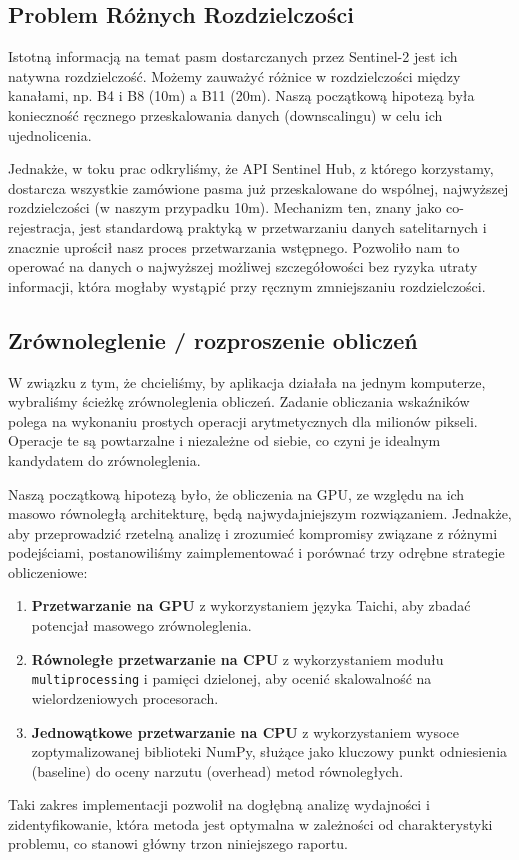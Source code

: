 \documentclass[12pt,a4paper]{article}
\begin{document}
\subsection{Problem Różnych Rozdzielczości}
Istotną informacją na temat pasm dostarczanych przez Sentinel-2 jest ich natywna rozdzielczość. Możemy zauważyć różnice w rozdzielczości między kanałami, np. B4 i B8 (10m) a B11 (20m). Naszą początkową hipotezą była konieczność ręcznego przeskalowania danych (downscalingu) w celu ich ujednolicenia.

Jednakże, w toku prac odkryliśmy, że API Sentinel Hub, z którego korzystamy, dostarcza wszystkie zamówione pasma już przeskalowane do wspólnej, najwyższej rozdzielczości (w naszym przypadku 10m). Mechanizm ten, znany jako co-rejestracja, jest standardową praktyką w przetwarzaniu danych satelitarnych i znacznie uprościł nasz proces przetwarzania wstępnego. Pozwoliło nam to operować na danych o najwyższej możliwej szczegółowości bez ryzyka utraty informacji, która mogłaby wystąpić przy ręcznym zmniejszaniu rozdzielczości.

\subsection{Zrównoleglenie / rozproszenie obliczeń}
W związku z tym, że chcieliśmy, by aplikacja działała na jednym komputerze, wybraliśmy ścieżkę zrównoleglenia obliczeń. Zadanie obliczania wskaźników polega na wykonaniu prostych operacji arytmetycznych dla milionów pikseli. Operacje te są powtarzalne i niezależne od siebie, co czyni je idealnym kandydatem do zrównoleglenia.

Naszą początkową hipotezą było, że obliczenia na GPU, ze względu na ich masowo równoległą architekturę, będą najwydajniejszym rozwiązaniem. Jednakże, aby przeprowadzić rzetelną analizę i zrozumieć kompromisy związane z różnymi podejściami, postanowiliśmy zaimplementować i porównać trzy odrębne strategie obliczeniowe:
\begin{enumerate}
    \item \textbf{Przetwarzanie na GPU} z wykorzystaniem języka Taichi, aby zbadać potencjał masowego zrównoleglenia.
    \item \textbf{Równoległe przetwarzanie na CPU} z wykorzystaniem modułu \texttt{multiprocessing} i pamięci dzielonej, aby ocenić skalowalność na wielordzeniowych procesorach.
    \item \textbf{Jednowątkowe przetwarzanie na CPU} z wykorzystaniem wysoce zoptymalizowanej biblioteki NumPy, służące jako kluczowy punkt odniesienia (baseline) do oceny narzutu (overhead) metod równoległych.
\end{enumerate}
Taki zakres implementacji pozwolił na dogłębną analizę wydajności i zidentyfikowanie, która metoda jest optymalna w zależności od charakterystyki problemu, co stanowi główny trzon niniejszego raportu.
\end{document}
